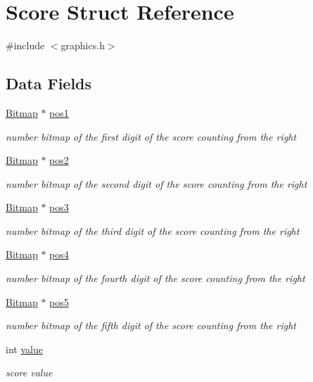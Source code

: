 \hypertarget{struct_score}{}\section{Score Struct Reference}
\label{struct_score}


{\ttfamily \#include $<$graphics.\+h$>$}

\subsection*{Data Fields}
\begin{DoxyCompactItemize}
\item 
\hyperlink{struct_bitmap}{Bitmap} $\ast$ \hyperlink{struct_score_a2a3a767ecef9123c1e42643582cab003}{pos1}
\begin{DoxyCompactList}\small\item\em number bitmap of the first digit of the score counting from the right \end{DoxyCompactList}\item 
\hyperlink{struct_bitmap}{Bitmap} $\ast$ \hyperlink{struct_score_a15053c692e0c6c1697973c862eec93ae}{pos2}
\begin{DoxyCompactList}\small\item\em number bitmap of the second digit of the score counting from the right \end{DoxyCompactList}\item 
\hyperlink{struct_bitmap}{Bitmap} $\ast$ \hyperlink{struct_score_ae6d712a88390d5bd95565149a4c4a68b}{pos3}
\begin{DoxyCompactList}\small\item\em number bitmap of the third digit of the score counting from the right \end{DoxyCompactList}\item 
\hyperlink{struct_bitmap}{Bitmap} $\ast$ \hyperlink{struct_score_a0fc4685b72d574cd90ba6bc7c7f5bae8}{pos4}
\begin{DoxyCompactList}\small\item\em number bitmap of the fourth digit of the score counting from the right \end{DoxyCompactList}\item 
\hyperlink{struct_bitmap}{Bitmap} $\ast$ \hyperlink{struct_score_aeed79af9ec6da4c464f1e73574945399}{pos5}
\begin{DoxyCompactList}\small\item\em number bitmap of the fifth digit of the score counting from the right \end{DoxyCompactList}\item 
int \hyperlink{struct_score_ac4f474c82e82cbb89ca7c36dd52be0ed}{value}
\begin{DoxyCompactList}\small\item\em score value \end{DoxyCompactList}\end{DoxyCompactItemize}


